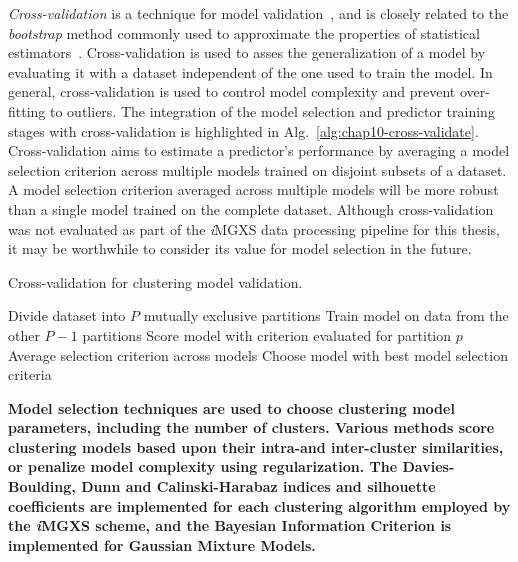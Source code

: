 \textit{Cross-validation} is a technique for model validation~\cite{kohavi1995cv}, and is closely related to the \textit{bootstrap} method commonly used to approximate the properties of statistical estimators~\cite{efron1994bootstrap}. Cross-validation is used to asses the generalization of a model by evaluating it with a dataset independent of the one used to train the model. In general, cross-validation is used to control model complexity and prevent over-fitting to outliers. The integration of the model selection and predictor training stages with cross-validation is highlighted in Alg.~\ref{alg:chap10-cross-validate}. Cross-validation aims to estimate a predictor's performance by averaging a model selection criterion across multiple models trained on disjoint subsets of a dataset. A model selection criterion averaged across multiple models will be more robust than a single model trained on the complete dataset. Although cross-validation was not evaluated as part of the \textit{i}\ac{MGXS} data processing pipeline for this thesis, it may be worthwhile to consider its value for model selection in the future.

\begin{algorithm}[h!]
\caption[Cross-Validation]{Cross-validation for clustering model validation.}
\label{alg:chap10-cross-validate}
\begin{algorithmic}[1]
  \State Divide dataset into $P$ mutually exclusive partitions
      \State Train model on data from the other $P-1$ partitions
      \State Score model with criterion evaluated for partition $p$ 
    \EndFor
    \State Average selection criterion across models
  \EndFor
  \State Choose model with best model selection criteria
\end{algorithmic}
\end{algorithm}

\clearpage

\begin{emphbox}
\textbf{Model selection techniques are used to choose clustering model parameters, including the number of clusters. Various methods score clustering models based upon their intra-and inter-cluster similarities, or penalize model complexity using regularization. The Davies-Boulding, Dunn and Calinski-Harabaz indices and silhouette coefficients are implemented for each clustering algorithm employed by the \textit{i}\ac{MGXS} scheme, and the Bayesian Information Criterion is implemented for Gaussian Mixture Models.}
\end{emphbox}

